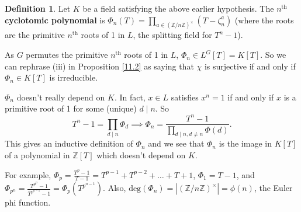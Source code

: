 \documentclass{article}
\theoremstyle{definition}
\newtheorem{defn}{Definition}[section]
\begin{document}
\begin{defn}
    Let $K$ be a field satisfying the above earlier hypothesis. The $n^{\text{th}}$ \textbf{cyclotomic polynomial} is $\Phi_n(T)=\prod_{a \in (\mathbb{Z}/n\mathbb{Z})^\times}^{} (T-\zeta_n^a)$ (where the roots are the primitive $n^{\text{th}}$ roots of 1 in $L$, the splitting field for $T^n-1$). 
\end{defn}
As $G$ permutes the primitive $n^{\text{th}}$ roots of 1 in $L$, $\Phi_n \in L^G[T] = K[T]$. So we can rephrase (iii) in Proposition \ref{11.2} as saying that $\chi$ is surjective if and only if $\Phi_n \in K[T]$ is irreducible.
\vspace{1mm}

$\Phi_n$ doesn't really depend on $K$. In fact, $x \in L$ satisfies $x^n=1$ if and only if $x$ is a primitive root of 1 for some (unique) $d \mid n$. So $$T^n-1 = \prod_{d \mid n}^{} \Phi_d \implies \Phi_n = \frac{T^n-1}{\prod_{d \mid n, d\neq n}^{} \Phi(d)}.$$
This gives an inductive definition of $\Phi_n$ and we see that $\Phi_n$ is the image in $K[T]$ of a polynomial in $\mathbb{Z}[T]$ which doesn't depend on $K$.

For example, $\Phi_p = \frac{T^p-1}{T-1}=T^{p-1}+T^{p-2}+\ldots+T+1$, $\Phi_1 = T-1$, and $\Phi_{p^n} = \frac{T^{p^n}-1}{T^{p^{n-1}}-1} = \Phi_p(T^{p^{n-1}})$. Also, $\text{deg}(\Phi_n) = |(\mathbb{Z}/n\mathbb{Z})^\times|=\phi(n)$, the Euler phi function.
\vspace{1mm}
\end{document}
